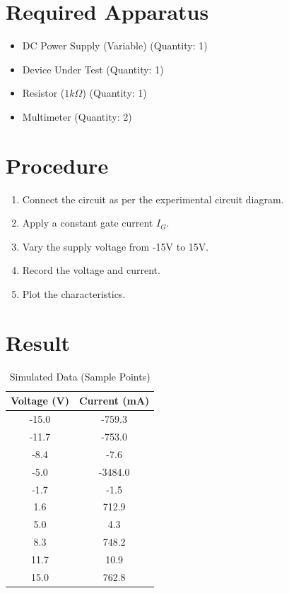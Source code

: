 \documentclass[12pt,a4paper]{article}
\begin{document}
\section{Required Apparatus}
\begin{itemize}

    \item DC Power Supply (Variable) (Quantity: 1)

    \item Device Under Test (Quantity: 1)

    \item Resistor ($1 k\Omega$) (Quantity: 1)

    \item Multimeter (Quantity: 2)

\end{itemize}

\section{Procedure}
\begin{enumerate}

    \item Connect the circuit as per the experimental circuit diagram.

    \item Apply a constant gate current $I_G$.

    \item Vary the supply voltage from -15V to 15V.

    \item Record the voltage and current.

    \item Plot the characteristics.

\end{enumerate}

\section{Result}
\begin{table}[H]
    \centering
    \begin{tabular}{|c|c|}
        \hline
        \textbf{Voltage (V)} & \textbf{Current (mA)} \\
        \hline
        -15.0 & -759.3 \\
        -11.7 & -753.0 \\
        -8.4 & -7.6 \\
        -5.0 & -3484.0 \\
        -1.7 & -1.5 \\
        1.6 & 712.9 \\
        5.0 & 4.3 \\
        8.3 & 748.2 \\
        11.7 & 10.9 \\
        15.0 & 762.8 \\
        \hline
    \end{tabular}
    \caption{Simulated Data (Sample Points)}
\end{table}
\end{document}
